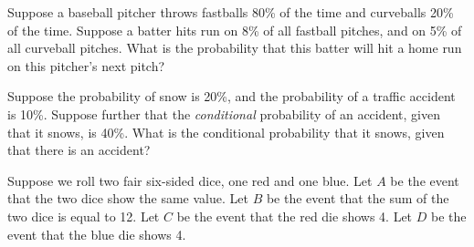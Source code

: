 \begin{exercises}
    \item Suppose a baseball pitcher throws fastballs 80\% of the time and curveballs 20\% of the time. Suppose a batter hits run on 8\% of all fastball pitches, and on 5\% of all curveball pitches. What is the probability that this batter will hit a home run on this pitcher's next pitch?
    \item Suppose the probability of snow is 20\%, and the probability of a traffic accident is 10\%. Suppose further that the \emph{conditional} probability of an accident, given that it snows, is 40\%. What is the conditional probability that it snows, given that there is an accident?
    \item Suppose we roll two fair six-sided dice, one red and one blue. Let $A$ be the event that the two dice show the same value. Let $B$ be the event that the sum of the two dice is equal to 12. Let $C$ be the event that the red die shows 4. Let $D$ be the event that the blue die shows 4.
\end{exercises}